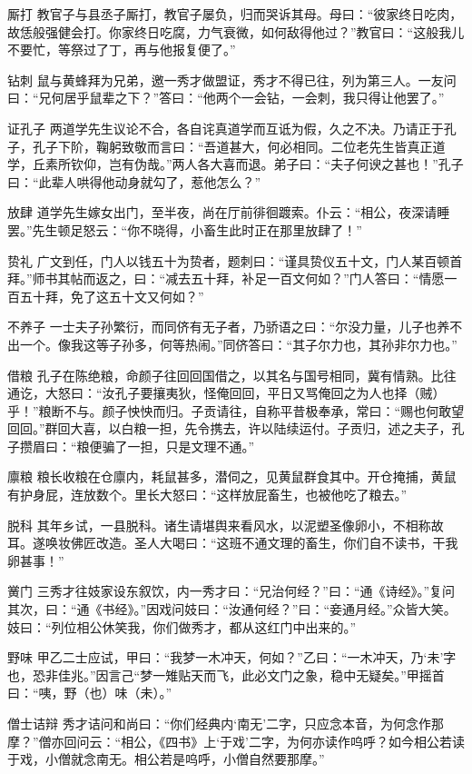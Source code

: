 \documentclass[12pt,UTF8]{ctexbook}
\begin{document}
厮打
教官子与县丞子厮打，教官子屡负，归而哭诉其母。母曰：“彼家终日吃肉，故恁般强健会打。你家终日吃腐，力气衰微，如何敌得他过？”教官曰：“这般我儿不要忙，等祭过了丁，再与他报复便了。”

钻刺
鼠与黄蜂拜为兄弟，邀一秀才做盟证，秀才不得已往，列为第三人。一友问曰：“兄何居乎鼠辈之下？”答曰：“他两个一会钻，一会刺，我只得让他罢了。”

证孔子
两道学先生议论不合，各自诧真道学而互诋为假，久之不决。乃请正于孔子，孔子下阶，鞠躬致敬而言曰：“吾道甚大，何必相同。二位老先生皆真正道学，丘素所钦仰，岂有伪哉。”两人各大喜而退。弟子曰：“夫子何谀之甚也！”孔子曰：“此辈人哄得他动身就勾了，惹他怎么？”

放肆
道学先生嫁女出门，至半夜，尚在厅前徘徊踱索。仆云：“相公，夜深请睡罢。”先生顿足怒云：“你不晓得，小畜生此时正在那里放肆了！”

贽礼
广文到任，门人以钱五十为贽者，题刺曰：“谨具贽仪五十文，门人某百顿首拜。”师书其帖而返之，曰：“减去五十拜，补足一百文何如？”门人答曰：“情愿一百五十拜，免了这五十文又何如？”

不养子
一士夫子孙繁衍，而同侪有无子者，乃骄语之曰：“尔没力量，儿子也养不出一个。像我这等子孙多，何等热闹。”同侪答曰：“其子尔力也，其孙非尔力也。”

借粮
孔子在陈绝粮，命颜子往回回国借之，以其名与国号相同，冀有情熟。比往通讫，大怒曰：“汝孔子要攘夷狄，怪俺回回，平日又骂俺回之为人也择（贼）乎！”粮断不与。颜子怏怏而归。子贡请往，自称平昔极奉承，常曰：“赐也何敢望回回。”群回大喜，以白粮一担，先令携去，许以陆续运付。子贡归，述之夫子，孔子攒眉曰：“粮便骗了一担，只是文理不通。”

廪粮
粮长收粮在仓廪内，耗鼠甚多，潜伺之，见黄鼠群食其中。开仓掩捕，黄鼠有护身屁，连放数个。里长大怒曰：“这样放屁畜生，也被他吃了粮去。”

脱科
其年乡试，一县脱科。诸生请堪舆来看风水，以泥塑圣像卵小，不相称故耳。遂唤妆佛匠改造。圣人大喝曰：“这班不通文理的畜生，你们自不读书，干我卵甚事！”

黉门
三秀才往妓家设东叙饮，内一秀才曰：“兄治何经？”曰：“通《诗经》。”复问其次，曰：“通《书经》。”因戏问妓曰：“汝通何经？”曰：“妾通月经。”众皆大笑。妓曰：“列位相公休笑我，你们做秀才，都从这红门中出来的。”

野味
甲乙二士应试，甲曰：“我梦一木冲天，何如？”乙曰：“一木冲天，乃‘未’字也，恐非佳兆。”因言己“梦一雉贴天而飞，此必文门之象，稳中无疑矣。”甲摇首曰：“咦，野（也）味（未）。”

僧士诘辩
秀才诘问和尚曰：“你们经典内‘南无’二字，只应念本音，为何念作那摩？”僧亦回问云：“相公，《四书》上‘于戏’二字，为何亦读作呜呼？如今相公若读于戏，小僧就念南无。相公若是呜呼，小僧自然要那摩。”
\end{document}
